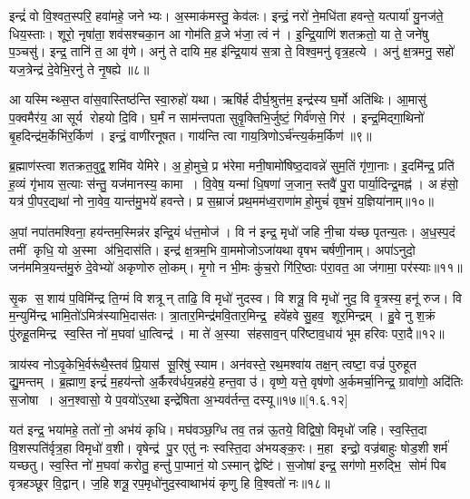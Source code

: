 इन्द्रं॑ वो वि॒श्वत॒स्परि॒ हवा॑महे॒ जनेभ्यः। अ॒स्माक॑मस्तु॒ केव॑लः। इन्द्रं॒ नरो॑ ने॒मधि॑ता हवन्ते॒ यत्पार्या॑ यु॒नज॑ते॒ धिय॒स्ताः। शूरो॒ नृषा॑ता॒ शव॑सश्चका॒न आ गोम॑ति व्र॒जे भ॑जा॒ त्वं न॑। इ॒न्द्रि॒याणि॑ शतक्रतो॒ या ते॒ जने॑षु प॒ञ्चसु॑। इन्द्र॒ तानि॑ त॒ आ वृ॑णे। अनु॑ ते दायि म॒ह इ॑न्द्रि॒याय॑ स॒त्रा ते॒ विश्व॒मनु॑ वृत्र॒हत्ये। अनु॑ क्ष॒त्रमनु॒ सहो॑ यज॒त्रेन्द्र॑ दे॒वेभि॒रनु॑ ते नृ॒षह्ये॥८॥

आ यस्मिन्थ्स॒प्त वा॑स॒वास्तिष्ठ॑न्ति स्वा॒रुहो॑ यथा। ऋषि॑र्\mbox{}ह दीर्घ॒श्रुत्त॑म॒ इन्द्र॑स्य घ॒र्मो अति॑थिः। आ॒मासु॑ प॒क्वमैर॑य॒ आ सूर्य रोहयो दि॒वि। घ॒र्मं न साम॑न्तपता सुवृ॒क्तिभि॒र्जुष्टं॒ गिर्व॑णसे॒ गिर॑। इन्द्र॒मिद्गा॒थिनो॑ बृ॒हदिन्द्र॑म॒र्केभि॑र॒र्किण॑। इन्द्रं॒ वाणी॑रनूषत। गाय॑न्ति त्वा गाय॒त्रिणोऽर्च॑न्त्य॒र्कम॒र्किण॑॥९॥

 ब्र॒ह्माण॑स्त्वा शतक्रत॒वुद्व॒शमि॑व येमिरे। अ॒हो॒मुचे॒ प्र भ॑रेमा मनी॒षामो॑षिष्ठ॒दावन्ने॑ सुम॒तिं गृ॑णा॒नाः। इ॒दमि॑न्द्र॒ प्रति॑ ह॒व्यं गृ॑भाय स॒त्याः स॑न्तु॒ यज॑मानस्य॒ कामा। वि॒वेष॒ यन्मा॑ धि॒षणा॑ ज॒जान॒ स्तवै॑ पु॒रा पार्या॒दिन्द्र॒मह्न॑। अह॑सो॒ यत्र॑ पी॒पर॒द्यथा॑ नो ना॒वेव॒ यान्त॑मु॒भये॑ हवन्ते। प्र स॒म्राजं॑ प्रथ॒मम॑ध्व॒राणा॑महो॒मुचं॑ वृष॒भं य॒ज्ञिया॑नाम्॥१०॥
 
अ॒पां नपा॑तमश्विना॒ हय॑न्तम॒स्मिन्न॑र इन्द्रि॒यं ध॑त्त॒मोज॑। वि न॑ इन्द्र॒ मृधो॑ जहि नी॒चा य॑च्छ पृतन्य॒तः। अ॒ध॒स्प॒दं तमीं कृधि॒ यो अ॒स्मा अ॑भि॒दास॑ति। इन्द्र॑ क्ष॒त्रम॒भि वा॒ममोजोऽजा॑यथा वृषभ चर्\mbox{}षणी॒नाम्। अपा॑ऽनुदो॒ जन॑ममित्र॒यन्त॑मु॒रुं दे॒वेभ्यो॑ अकृणोरु लो॒कम्। मृ॒गो न भी॒मः कु॑च॒रो गि॑रि॒ष्ठाः प॑रा॒वत॒ आ ज॑गामा॒ पर॑स्याः॥११॥
 
   सृ॒क स॒शाय॑ प॒विमि॑न्द्र ति॒ग्मं वि शत्रून् ताढि॒ वि मृधो॑ नुदस्व। वि शत्रू॒\an{} वि मृधो॑ नुद॒ वि वृ॒त्रस्य॒ हनू॑ रुज। वि म॒न्युमि॑न्द्र भामि॒तो॑ऽमित्र॑स्याभि॒दास॑तः। त्रा॒तार॒मिन्द्र॑मवि॒तार॒मिन्द्र॒ हवे॑हवे सु॒हव॒ शूर॒मिन्द्रम्। हु॒वे नु श॒क्रं पु॑रुहू॒तमिन्द्र स्व॒स्ति नो॑ म॒घवा॑ धा॒त्विन्द्र॑। मा ते॑ अ॒स्या स॑हसाव॒न् परि॑ष्टाव॒धाय॑ भूम हरिवः परा॒दै॥१२॥ 
   
   त्राय॑स्व नोऽवृ॒केभि॒र्वरू॑थै॒स्तव॑ प्रि॒यास॑ सू॒रिषु॑ स्याम। अन॑वस्ते॒ रथ॒मश्वा॑य तक्ष॒न् त्वष्टा॒ वज्रं॑ पुरुहूत द्यु॒मन्तम्। ब्र॒ह्माण॒ इन्द्रं॑ म॒हय॑न्तो अ॒र्कैरव॑र्धय॒न्नह॑ये॒ हन्त॒वा उ॑। वृष्णे॒ यत्ते॒ वृष॑णो अ॒र्कमर्चा॒निन्द्र॒ ग्रावा॑णो॒ अदि॑तिः स॒जोषा। अ॒न॒श्वासो॒ ये प॒वयो॑ऽर॒था इन्द्रे॑षिता अ॒भ्यव॑र्तन्त॒ दस्यू\sn{}॥१७॥[१.६.१२]


यत॑ इन्द्र॒ भया॑महे॒ ततो॑ नो॒ अभ॑यं कृधि।
मघ॑वञ्छ॒ग्धि तव॒ तन्न॑ ऊ॒तये॒ विद्विषो॒ विमृधो॑ जहि।
स्व॒स्ति॒दा वि॒शस्पति॑र्वृत्र॒हा विमृधो॑ व॒शी।
वृषेन्द्र॑ पु॒र एतु॑ नः स्वस्ति॒दा अ॑भयङ्क॒रः।
म॒हा इन्द्रो॒ वज्र॑बाहुः षोड॒शी शर्म॑ यच्छतु।
स्व॒स्ति नो॑ म॒घवा॑ करोतु॒ हन्तु॑ पा॒प्मानं॒ योऽस्मान्‌ द्वेष्टि॑।
स॒जोषा॑ इन्द्र॒ सग॑णो म॒रुद्भि॒ सोमं॑ पिब वृत्रहञ्छूर वि॒द्वान्‌।
ज॒हि शत्रू॒रप॒मृधो॑नुद॒स्वाथाभ॑यं कृणु हि वि॒श्वतो॑ नः॥१८॥

